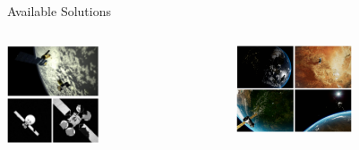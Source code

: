 \documentclass[10pt]{beamer}
\begin{document}
\begin{frame}{Available Solutions}
\begin{overlayarea}{\textwidth}{0.8\textheight}
    \begin{columns}[T,onlytextwidth]
      \hspace{1.58cm}
      \begin{column}{0.5\textwidth}
        \includegraphics[width=0.44\textwidth]{gfx/surrender.eps}
      \end{column}
      \hspace{-0.78cm}
      \begin{column}{0.5\textwidth}
        \includegraphics[width=0.52\textwidth]{gfx/URSO.eps}
      \end{column}
    \end{columns}
  \end{overlayarea}
\end{frame}
\end{document}
